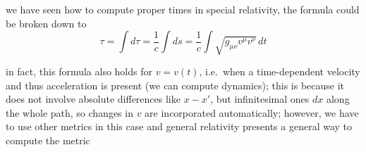 we have seen how to compute proper times in special relativity, the formula could be broken down to 
\begin{equation}
\tau = \int d\tau = \frac{1}{c} \int ds = \frac{1}{c} \int \sqrt{g_{\mu \nu} v^\mu v^\nu} \, dt
\end{equation}

in fact, this formula also holds for $v = v(t)$, i.e.~when a time-dependent velocity and thus acceleration is present (we can compute dynamics); this is because it does not involve absolute differences like $x - x'$, but infinitesimal ones $dx$ along the whole path, so changes in $v$ are incorporated automatically; however, we have to use other metrics in this case and general relativity presents a general way to compute the metric




